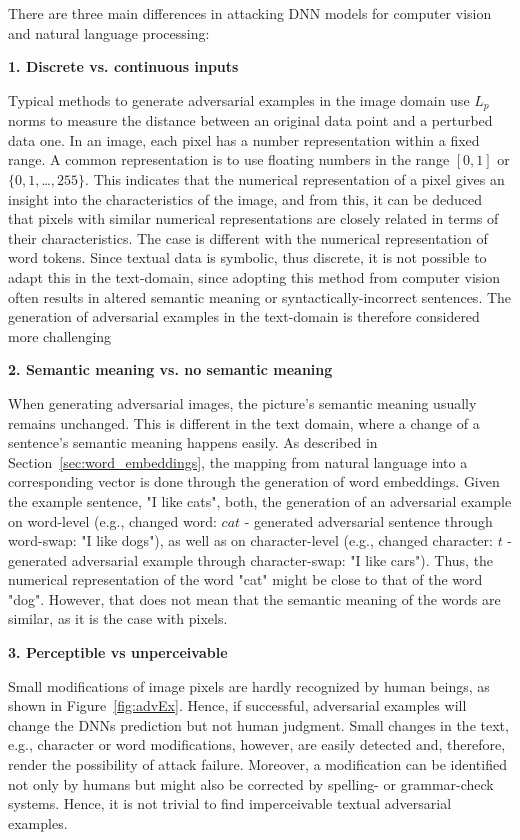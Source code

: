 There are three main differences in attacking DNN models for computer vision and natural language processing:

\textbf{1. Discrete vs. continuous inputs}

Typical methods to generate adversarial examples in the image domain use $L_p$ norms to measure the distance between an original data point and a perturbed data one. 
In an image, each pixel has a number representation within a fixed range. A common representation is to use floating numbers in the range ${[0,1]}$ or ${\{0,1,}$\dots${,255\}}$. This indicates that the numerical representation of a pixel gives an insight into the characteristics of the image, and from this, it can be deduced that pixels with similar numerical representations are closely related in terms of their characteristics. The case is different with the numerical representation of word tokens.
Since textual data is symbolic, thus discrete, it is not possible to adapt this in the text-domain, since adopting this method from computer vision often results in altered semantic meaning or syntactically-incorrect sentences. The generation of adversarial examples in the text-domain is therefore considered more challenging\cite{carlini2018audio} 

\textbf{2. Semantic meaning vs. no semantic meaning}

When generating adversarial images, the picture's semantic meaning usually remains unchanged. This is different in the text domain, where a change of a sentence's semantic meaning happens easily. As described in Section~\ref{sec:word_embeddings}, the mapping from natural language into a corresponding vector is done through the generation of word embeddings.
Given the example sentence, "I like cats", both, the generation of an adversarial example on word-level (e.g., changed word: $cat$ - generated adversarial sentence through word-swap: "I like dogs"), as well as on character-level (e.g., changed character: $t$ - generated adversarial example through character-swap: "I like cars"). Thus, the numerical representation of the word "cat" might be close to that of the word "dog".
However, that does not mean that the semantic meaning of the words are similar, as it is the case with pixels.


\textbf{3. Perceptible vs unperceivable}

Small modifications of image pixels are hardly recognized by human beings, as shown in Figure~\ref{fig:advEx}. Hence, if successful, adversarial examples will change the DNNs prediction but not human judgment. Small changes in the text, e.g., character or word modifications, however, are easily detected and, therefore, render the possibility of attack failure. Moreover, a modification can be identified not only by humans but might also be corrected by spelling- or grammar-check systems. Hence, it is not trivial to find imperceivable textual adversarial examples.

